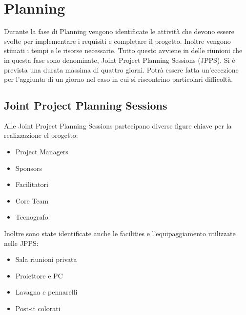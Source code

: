 \chapter{Planning}
Durante la fase di Planning vengono identificate le attività che devono essere svolte per 
implementare i requisiti e completare il progetto. Inoltre vengono stimati i tempi e le 
risorse necessarie. 
Tutto questo avviene in delle riunioni che in questa fase sono denominate, Joint Project 
Planning Sessions (JPPS).
Si è prevista una durata massima di quattro giorni. Potrà essere fatta un'eccezione per
l'aggiunta di un giorno nel caso in cui si riscontrino particolari difficoltà.

\section{Joint Project Planning Sessions}
Alle Joint Project Planning Sessions partecipano diverse figure chiave per la realizzazione 
el progetto:
\begin{itemize}
    \item Project Managers
    \item Sponsors
    \item Facilitatori
    \item Core Team
    \item Tecnografo
\end{itemize}

Inoltre sono state identificate anche le facilities e l'equipaggiamento utilizzate nelle JPPS:
\begin{itemize}
    \item Sala riunioni privata
    \item Proiettore e PC 
    \item Lavagna e pennarelli
    \item Post-it colorati
\end{itemize}


